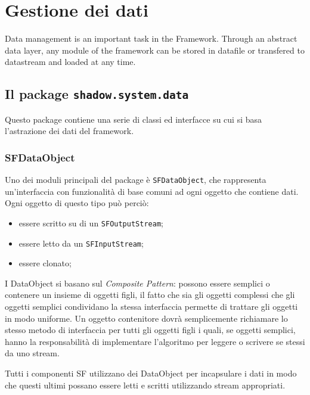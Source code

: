 %	
\chapter{Gestione dei dati}
\label{ch:gestdati}
Data management is an important task in the Framework. Through an abstract data layer, any module of the framework can be stored in datafile or transfered to datastream and loaded at any time. 

\section{Il package \texttt{shadow.system.data}}
\label{sub:shadow_system_data}
Questo package contiene una serie di classi ed interfacce su cui si basa l'astrazione dei dati del framework.

\subsection{SFDataObject}
\label{sub:sfdataobject}
Uno dei moduli principali del package \`e \texttt{SFDataObject}, che rappresenta un'interfaccia con funzionalit\`a di base comuni ad ogni oggetto che contiene dati. 
Ogni oggetto di questo tipo pu\`o perci\`o:
\begin{itemize}
	\item essere scritto su di un \texttt{SFOutputStream};
	\item essere letto da un \texttt{SFInputStream};
	\item essere clonato;
\end{itemize}
I DataObject si basano sul \textit{Composite Pattern}: possono essere semplici o contenere un insieme di oggetti figli, il fatto che sia gli oggetti complessi che gli oggetti semplici condividano la stessa interfaccia permette di trattare gli oggetti in modo uniforme. Un oggetto contenitore dovr\`a semplicemente richiamare lo stesso metodo di interfaccia per tutti gli oggetti figli i quali, se oggetti semplici, hanno la responsabilit\`a di implementare l'algoritmo per leggere o scrivere se stessi da uno stream.

Tutti i componenti SF utilizzano dei DataObject per incapsulare i dati in modo che questi ultimi possano essere letti e scritti utilizzando stream appropriati.

